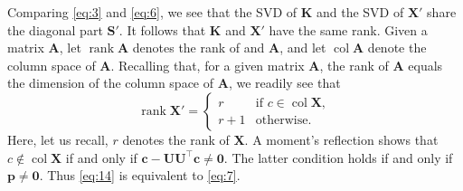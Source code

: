 \documentclass[11pt,a4paper]{article}
\theoremstyle{mybreak}
\numberwithin{dummy}{section}
\theoremstyle{plain}
\theoremstyle{plain}
\theoremstyle{plain}
\theoremstyle{plain}
\theoremstyle{MyNonumberplain}
\DeclareMathOperator*{\rk}{rank}
\DeclareMathOperator{\col}{col}
\newcommand{\0}{\M{0}}
\newcommand{\M}[1]{\mathbf{#1}}
\newcommand{\T}{\top}
\newcommand{\ve}[1]{\mathbf{#1}}
\begin{document}
Comparing \eqref{eq:3} and \eqref{eq:6}, we see that the SVD of $\M{K}$ and the SVD of $\M{X}'$ share the diagonal part $\M{S}'$.  It follows that $\M{K}$ and $\M{X}'$ have the same rank. Given a matrix $\M{A}$, let $\rk \M{A}$ denotes the rank of and $\M{A}$, and let $\col \M{A}$ denote the column space of $\M{A}$. Recalling that, for a given matrix $\M{A}$, the rank of $\M{A}$ equals the dimension of the column space of $\M{A}$, we readily see that
\begin{equation}
  \label{eq:14}
  \rk \M{X}' =
  \begin{cases}
    r & \text{if $c \in \col \M{X}$},
    \\
    r + 1 & \text{otherwise}.
  \end{cases}
\end{equation}
Here, let us recall, $r$ denotes the rank of $\M{X}$.  A moment's reflection shows that $c \notin \col \M{X}$ if and only if
\begin{math}
  \ve{c} - \M{U} \M{U}^\T \ve{c} \neq \0.
\end{math}
The latter condition holds if and only if
\begin{math}
  \ve{p} \neq \0.
\end{math}
Thus \eqref{eq:14} is equivalent to \eqref{eq:7}.


\end{document}
